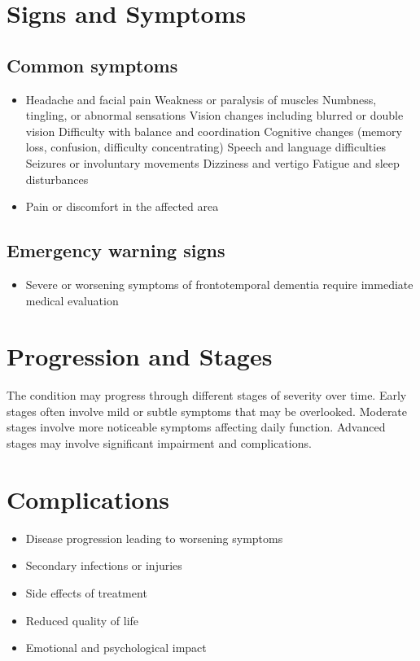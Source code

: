 \section{Signs and Symptoms}
\subsection{Common symptoms}
\begin{itemize}[noitemsep]
  \item Headache and facial pain Weakness or paralysis of muscles Numbness, tingling, or abnormal sensations Vision changes including blurred or double vision Difficulty with balance and coordination Cognitive changes (memory loss, confusion, difficulty concentrating) Speech and language difficulties Seizures or involuntary movements Dizziness and vertigo Fatigue and sleep disturbances
  \item Pain or discomfort in the affected area
  \end{itemize}
\subsection{Emergency warning signs}
\begin{itemize}[noitemsep]
  \item Severe or worsening symptoms of frontotemporal dementia require immediate medical evaluation
\end{itemize}
\section{Progression and Stages}
The condition may progress through different stages of severity over time. Early stages often involve mild or subtle symptoms that may be overlooked. Moderate stages involve more noticeable symptoms affecting daily function. Advanced stages may involve significant impairment and complications.
\section{Complications}
\begin{itemize}[noitemsep]
  \item Disease progression leading to worsening symptoms
  \item Secondary infections or injuries
  \item Side effects of treatment
  \item Reduced quality of life
  \item Emotional and psychological impact
\end{itemize}
